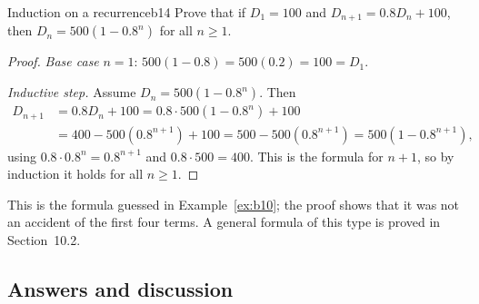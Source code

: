 \documentclass[11pt]{article}
\begin{document}
\begin{exmp}{Induction on a recurrence}{b14}
Prove that if $D_1=100$ and $D_{n+1}=0.8D_n+100$, then $D_n=500(1-0.8^n)$ for all $n\ge1$.

\begin{proof}
\emph{Base case} $n=1$: $500(1-0.8)=500(0.2)=100=D_1$.

\emph{Inductive step.} Assume $D_n=500(1-0.8^n)$. Then
\begin{align*}
D_{n+1}&=0.8D_n+100=0.8\cdot500(1-0.8^n)+100\\
&=400-500(0.8^{n+1})+100=500-500(0.8^{n+1})=500\left(1-0.8^{n+1}\right),
\end{align*}
using $0.8\cdot0.8^n=0.8^{n+1}$ and $0.8\cdot500=400$. This is the formula for $n+1$, so by induction it holds for all $n\ge1$.
\end{proof}
This is the formula guessed in Example~\ref{ex:b10}; the proof shows that it was not an accident of the first four terms. A general formula of this type is proved in Section~10.2.
\end{exmp}

\subsection*{Answers and discussion}
\end{document}
